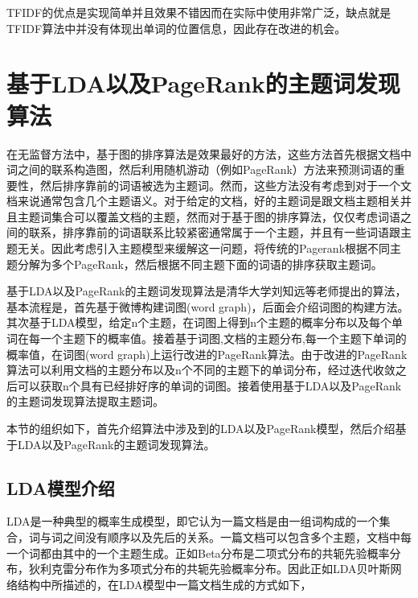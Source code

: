\documentclass[master]{njuthesis}
\begin{document}
    TFIDF的优点是实现简单并且效果不错因而在实际中使用非常广泛，缺点就是TFIDF算法中并没有体现出单词的位置信息，因此存在改进的机会。

\section{基于LDA以及PageRank的主题词发现算法}

    在无监督方法中，基于图的排序算法是效果最好的方法，这些方法首先根据文档中词之间的联系构造图，然后利用随机游动（例如PageRank）方法来预测词语的重要性，然后排序靠前的词语被选为主题词。然而，这些方法没有考虑到对于一个文档来说通常包含几个主题语义。对于给定的文档，好的主题词是跟文档主题相关并且主题词集合可以覆盖文档的主题，然而对于基于图的排序算法，仅仅考虑词语之间的联系，排序靠前的词语联系比较紧密通常属于一个主题，并且有一些词语跟主题无关。因此考虑引入主题模型来缓解这一问题，将传统的Pagerank根据不同主题分解为多个PageRank，然后根据不同主题下面的词语的排序获取主题词。

    基于LDA以及PageRank的主题词发现算法\cite{keyphrase}是清华大学刘知远等老师提出的算法，基本流程是，首先基于微博构建词图(word graph)，后面会介绍词图的构建方法。其次基于LDA模型，给定n个主题，在词图上得到n个主题的概率分布以及每个单词在每一个主题下的概率值。接着基于词图,文档的主题分布,每一个主题下单词的概率值，在词图(word graph)上运行改进的PageRank算法。由于改进的PageRank算法可以利用文档的主题分布以及n个不同的主题下的单词分布，经过迭代收敛之后可以获取n个具有已经排好序的单词的词图。接着使用基于LDA以及PageRank的主题词发现算法提取主题词。

   本节的组织如下，首先介绍算法中涉及到的LDA以及PageRank模型，然后介绍基于LDA以及PageRank的主题词发现算法。

\subsection{LDA模型介绍}

    LDA是一种典型的概率生成模型，即它认为一篇文档是由一组词构成的一个集合，词与词之间没有顺序以及先后的关系\cite{LDA}。一篇文档可以包含多个主题，文档中每一个词都由其中的一个主题生成。正如Beta分布是二项式分布的共轭先验概率分布，狄利克雷分布作为多项式分布的共轭先验概率分布。因此正如LDA‎贝叶斯网络结构中所描述的，在LDA模型中一篇文档生成的方式如下，\\
\\
\end{document}
